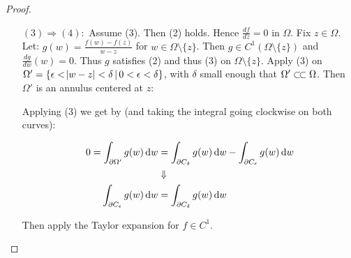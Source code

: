 \begin{proof}
\begin{enumerate}
    \item[$(3) \Rightarrow (4):$] Assume (3). Then (2) holds. Hence $\frac{df}{d\overline{z}} = 0$ in $\Omega$. Fix $z\in\Omega$. Let: $g(w) = \frac{f(w)-f(z)}{w-z}$ for $w\in\Omega \setminus \{z\}$. Then $g\in C^1(\Omega \setminus \{z\})$ and $\frac{dg}{d\overline{w}}(w) = 0$. Thus $g$ satisfies (2) and thus (3) on $\Omega \setminus \{z\}$. Apply (3) on $\Omega' = \{ \epsilon < \abs{w-z} < \delta \, | \, 0<\epsilon<\delta\}$, with $\delta$ small enough that $\Omega' \ssubset \Omega$. Then $\Omega'$ is an annulus centered at $z$:
    
    \begin{center}
    \end{center}
    
    
    Applying (3) we get by (and taking the integral going clockwise on both curves):
    
    \begin{align*}
        0 = \int_{\partial \Omega'} g(w) \dif w &= \int_{\partial C_\delta} g(w)  \dif w - \int_{\partial C_\epsilon} g(w)  \dif w\\
        &\Downarrow\\
        \int_{\partial C_\epsilon} g(w)  \dif w &= \int_{\partial C_\delta} g(w)  \dif w
    \end{align*}
    
    Then apply the Taylor expansion for $f\in C^1$.
    

\end{enumerate}
\end{proof}

